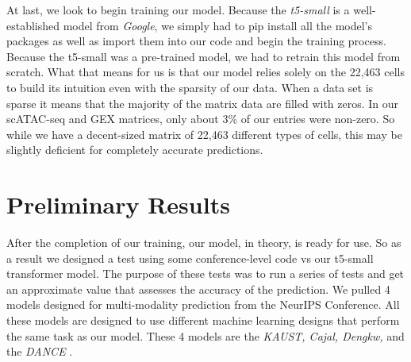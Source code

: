 At last, we look to begin training our model. Because the \emph{t5-small} is a well-established model from \emph{Google}, we simply had to pip install all the model's packages as well as import them into our code and begin the training process. Because the t5-small was a pre-trained model, we had to retrain this model from scratch. What that means for us is that our model relies solely on the 22,463 cells to build its intuition even with the sparsity of our data. When a data set is sparse it means that the majority of the matrix data are filled with zeros. In our scATAC-seq and GEX matrices, only about 3\% of our entries were non-zero. So while we have a decent-sized matrix of 22,463 different types of cells, this may be slightly deficient for completely accurate predictions.  

\section{Preliminary Results}

After the completion of our training, our model, in theory, is ready for use. So as a result we designed a test using some conference-level code vs our t5-small transformer model. The purpose of these tests was to run a series of tests and get an approximate value that assesses the accuracy of the prediction. We pulled 4 models designed for multi-modality prediction from the NeurIPS Conference. All these models are designed to use different machine learning designs that perform the same task as our model. These 4 models are the \emph{KAUST, Cajal, Dengkw,} and the \emph{DANCE} \cite{thirteen}. 


